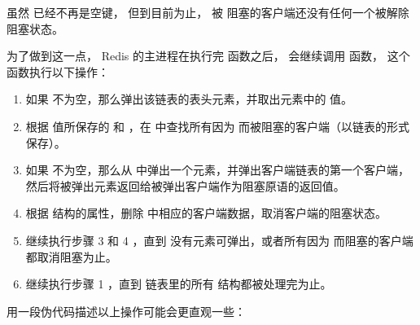 \documentclass[a4paper,11pt,english]{sphinxmanual}
\begin{document}
虽然  已经不再是空键，
但到目前为止，
被  阻塞的客户端还没有任何一个被解除阻塞状态。

为了做到这一点，
Redis 的主进程在执行完  函数之后，
会继续调用  函数，
这个函数执行以下操作：
\begin{enumerate}
\item {} 
如果  不为空，那么弹出该链表的表头元素，并取出元素中的  值。

\item {} 
根据  值所保存的  和  ，在  中查找所有因为  而被阻塞的客户端（以链表的形式保存）。

\item {} 
如果  不为空，那么从  中弹出一个元素，并弹出客户端链表的第一个客户端，然后将被弹出元素返回给被弹出客户端作为阻塞原语的返回值。

\item {} 
根据  结构的属性，删除  中相应的客户端数据，取消客户端的阻塞状态。

\item {} 
继续执行步骤 3 和 4 ，直到  没有元素可弹出，或者所有因为  而阻塞的客户端都取消阻塞为止。

\item {} 
继续执行步骤 1 ，直到  链表里的所有  结构都被处理完为止。

\end{enumerate}

用一段伪代码描述以上操作可能会更直观一些：
\end{document}
